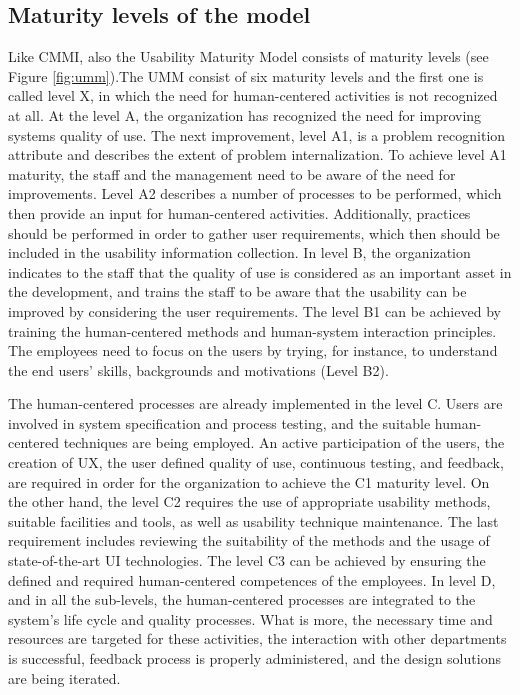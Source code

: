 \documentclass[12pt,a4paper,oneside,pdftex]{report}
\begin{document}
 \subsection{Maturity levels of the model}
Like CMMI, also the Usability Maturity Model consists of maturity levels (see Figure \ref{fig:umm}).The UMM consist of six maturity levels and the first one is called level X, in which the need for human-centered activities is not recognized at all. At the level A, the organization has recognized the need for improving systems quality of use. The next improvement, level A1, is a problem recognition attribute and describes the extent of problem internalization. To achieve level A1 maturity, the staff and the management need to be aware of the need for improvements. Level A2 describes a number of processes to be performed, which then provide an input for human-centered activities. Additionally, practices should be performed in order to gather user requirements, which then should be included in the usability information collection. In level B, the organization indicates to the staff that the quality of use is considered as an important asset in the development, and trains the staff to be aware that the usability can be improved by considering the user requirements. The level B1 can be achieved by training the human-centered methods and human-system interaction principles. The employees need to focus on the users by trying, for instance, to understand the end users' skills, backgrounds and motivations (Level B2). \citep{RefWorks:30}

The human-centered processes are already implemented in the level C. Users are involved in system specification and process testing, and the suitable human-centered techniques are being employed. An active participation of the users, the creation of UX, the user defined quality of use, continuous testing, and feedback, are required in order for the organization to achieve the C1 maturity level. On the other hand, the level C2 requires the use of appropriate usability methods, suitable facilities and tools, as well as usability technique maintenance. The last requirement includes reviewing the suitability of the methods and the usage of state-of-the-art UI technologies. The level C3 can be achieved by ensuring the defined and required human-centered competences of the employees. In level D, and in all the sub-levels, the human-centered processes are integrated to the system's life cycle and quality processes. What is more, the necessary time and resources are targeted for these activities, the interaction with other departments is successful, feedback process is properly administered, and the design solutions are being iterated. \citep{RefWorks:30}
\end{document}
